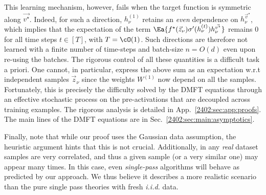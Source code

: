 
This learning mechanism, however, fails when the target function is symmetric along $\vec{v^\star}$. Indeed, for such a direction, $h^{(1)}_\nu$ retains an {\it even} dependence on $h^{\vec{v}^\star}_{\nu}$, which implies that the expectation of the term 
$\Ea{f^\star(\vec z_\nu)\sigma'(h^{(t)}_\nu)h^{\vec{v^\star}}_{\nu}}$
remains $0$ for all time steps $t \in [T]$, with $T =\cO(1)$. Such directions are therefore not learned with a finite number of time-steps and batch-size $n=O(d)$ even upon re-using the batches.
The rigorous control of all these quantities is a difficult task a priori. One cannot, in particular, express the above sum as an expectation w.r.t independent samples $\vec z_\nu$ since the weights $W^{(1)}$ now depend on all the samples. Fortunately, this is precisely the difficulty solved by the DMFT equations through an effective stochastic process on the pre-activations that are decoupled across training examples. The rigorous analysis is detailed in App.~\ref{2402:sec:app:proofs}. The main lines of the DMFT equations are in Sec.~\ref{2402:sec:main:asymptotics}.

Finally, note that while our proof uses the Gaussian data assumption, the heuristic argument hints that this is not crucial. Additionally, in any {\it real} dataset samples are very correlated, and thus a given sample (or a very similar one) may appear many times. In this case, even {\it single-pass} algorithms will behave as predicted by our approach. We thus believe it describes a more realistic scenario than the pure single pass theories with fresh {\it i.i.d.} data.





